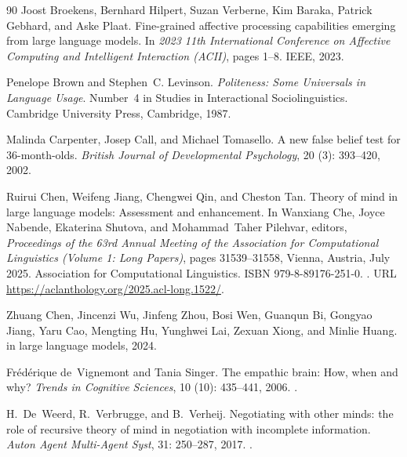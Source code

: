 \begin{thebibliography}{90}
Joost Broekens, Bernhard Hilpert, Suzan Verberne, Kim Baraka, Patrick Gebhard, and Aske Plaat.
\newblock Fine-grained affective processing capabilities emerging from large language models.
\newblock In \emph{2023 11th International Conference on Affective Computing and Intelligent Interaction (ACII)}, pages 1--8. IEEE, 2023.

Penelope Brown and Stephen~C. Levinson.
\newblock \emph{Politeness: Some Universals in Language Usage}.
\newblock Number~4 in Studies in Interactional Sociolinguistics. Cambridge University Press, Cambridge, 1987.

Malinda Carpenter, Josep Call, and Michael Tomasello.
\newblock A new false belief test for 36-month-olds.
\newblock \emph{British Journal of Developmental Psychology}, 20 (3): 393--420, 2002.

Ruirui Chen, Weifeng Jiang, Chengwei Qin, and Cheston Tan.
\newblock Theory of mind in large language models: Assessment and enhancement.
\newblock In Wanxiang Che, Joyce Nabende, Ekaterina Shutova, and Mohammad~Taher Pilehvar, editors, \emph{Proceedings of the 63rd Annual Meeting of the Association for Computational Linguistics (Volume 1: Long Papers)}, pages 31539--31558, Vienna, Austria, July 2025. Association for Computational Linguistics.
\newblock ISBN 979-8-89176-251-0.
\newblock {}.
\newblock URL \url{https://aclanthology.org/2025.acl-long.1522/}.

Zhuang Chen, Jincenzi Wu, Jinfeng Zhou, Bosi Wen, Guanqun Bi, Gongyao Jiang, Yaru Cao, Mengting Hu, Yunghwei Lai, Zexuan Xiong, and Minlie Huang.
 in large language models, 2024.

Fr\'{e}d\'{e}rique de~Vignemont and Tania Singer.
\newblock The empathic brain: How, when and why?
\newblock \emph{Trends in Cognitive Sciences}, 10 (10): 435--441, 2006.
\newblock {}.

H.~De~Weerd, R.~Verbrugge, and B.~Verheij.
\newblock Negotiating with other minds: the role of recursive theory of mind in negotiation with incomplete information.
\newblock \emph{Auton Agent Multi-Agent Syst}, 31: 250--287, 2017.
\newblock {}.


\end{thebibliography}
